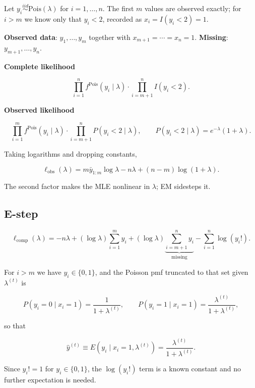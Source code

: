 \documentclass[
  letterpaper,
  DIV=11,
  numbers=noendperiod]{scrreprt}
\begin{document}
Let \(y_i \overset{iid}{\sim} \text{Pois}(\lambda)\) for
\(i = 1, \ldots, n\). The first \(m\) values are observed exactly; for
\(i > m\) we know only that \(y_i < 2\), recorded as
\(x_i = I(y_i < 2) = 1\).

\textbf{Observed data}: \(y_1, \ldots, y_m\) together with
\(x_{m+1} = \cdots = x_n = 1\). \textbf{Missing}:
\(y_{m+1}, \ldots, y_n\).

\textbf{Complete likelihood}

\[
\prod_{i=1}^{n} f^{\text{Pois}}(y_i \mid \lambda) \cdot \prod_{i=m+1}^{n} I(y_i < 2) .
\]

\textbf{Observed likelihood}

\[
\prod_{i=1}^{m} f^{\text{Pois}}(y_i \mid \lambda) \cdot \prod_{i=m+1}^{n} P(y_i < 2 \mid \lambda),
\qquad P(y_i < 2 \mid \lambda) = e^{-\lambda}(1 + \lambda) .
\]

Taking logarithms and dropping constants,

\[
\ell_{\text{obs}}(\lambda) = m \bar y_{1:m} \log \lambda - n \lambda + (n - m)\log(1 + \lambda) .
\]

The second factor makes the MLE nonlinear in \(\lambda\); EM sidesteps
it.

\subsection{E-step}\label{e-step}

\[
\ell_{\text{comp}}(\lambda) = -n\lambda + (\log \lambda) \sum_{i=1}^{m} y_i
+ (\log \lambda) \underbrace{\sum_{i=m+1}^{n} y_i}_{\text{missing}}
- \sum_{i=1}^{n} \log(y_i!) .
\]

For \(i > m\) we have \(y_i \in \{0, 1\}\), and the Poisson pmf
truncated to that set given \(\lambda^{(t)}\) is

\[
P\!\left(y_i = 0 \mid x_i = 1\right) = \frac{1}{1 + \lambda^{(t)}},
\qquad
P\!\left(y_i = 1 \mid x_i = 1\right) = \frac{\lambda^{(t)}}{1 + \lambda^{(t)}} ,
\]

so that

\[
\hat y^{(t)} \equiv E\!\left(y_i \mid x_i = 1, \lambda^{(t)}\right) = \frac{\lambda^{(t)}}{1 + \lambda^{(t)}} .
\]

Since \(y_i! = 1\) for \(y_i \in \{0, 1\}\), the \(\log(y_i!)\) term is
a known constant and no further expectation is needed.
\end{document}
